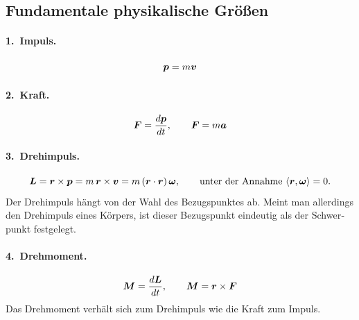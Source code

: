 \begin{otherlanguage}{ngerman}

\section{Fundamentale physikalische Größen}
\label{sec:physical-quantities}

\paragraph{1.\ Impuls.}
\[
  \bm{p} = m \bm{v}
\]

\paragraph{2.\ Kraft.}
\[
  \bm{F} = \frac{d\bm{p}}{dt} , \qquad
  \bm{F} = m \bm{a}
\]

\paragraph{3.\ Drehimpuls.}
\[
  \bm{L} = \bm{r} \times \bm{p}
           = m \, \bm{r} \times \bm{v}
           = m \, (\bm{r} \cdot \bm{r}) \, \bm{\omega} ,
  \qquad \text{unter der Annahme } \langle \bm{r}, \bm{\omega} \rangle = 0 .
\]
Der Drehimpuls hängt von der Wahl des Bezugspunktes ab. Meint man
allerdings den Drehimpuls eines Körpers, ist dieser Bezugspunkt eindeutig
als der Schwerpunkt festgelegt.

\paragraph{4.\ Drehmoment.}
\[
  \bm{M} = \frac{d\bm{L}}{dt} , \qquad
  \bm{M} = \bm{r} \times \bm{F}
\]
Das Drehmoment verhält sich zum Drehimpuls wie die Kraft zum Impuls.


\end{otherlanguage}

